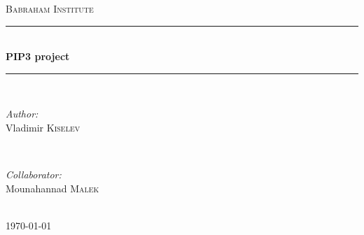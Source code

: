 \documentclass[12pt]{article} %
\begin{document}

\begin{titlepage}

\newcommand{\HRule}{\rule{\linewidth}{0.5mm}} %

\center %

\textsc{\LARGE Babraham Institute}\\[1.5cm] %

\HRule \\[0.4cm]
{ \huge \bfseries PIP3 project}\\[0.4cm] %
\HRule \\[1.5cm]

\begin{minipage}{0.4\textwidth}
\begin{flushleft} \large
\emph{Author:}\\
Vladimir \textsc{Kiselev} %
\end{flushleft}
\end{minipage}
~
\begin{minipage}{0.4\textwidth}
\begin{flushright} \large
\emph{Collaborator:} \\
Mounahannad \textsc{Malek} %
\end{flushright}
\end{minipage}\\[4cm]

{\large \today}\\[3cm] %


\vfill %

\end{titlepage}


\tableofcontents %
\end{document}
